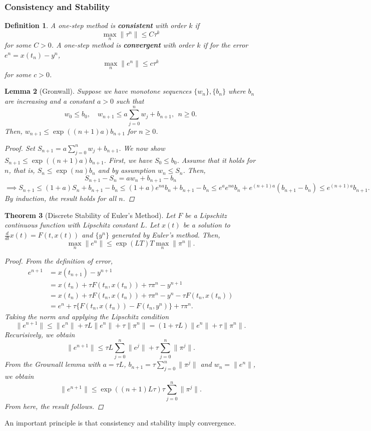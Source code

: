 \documentclass{article}
\newtheorem{theorem}{Theorem}[subsection] %
\newtheorem{lemma}[theorem]{Lemma}
\newtheorem{definition}[theorem]{Definition}
\theoremstyle{definition}
\theoremstyle{definition}
\begin{document}
\subsubsection{Consistency and Stability}
\begin{definition}
    A one-step method is \textbf{consistent} with order $k$ if
    $$\max_{n}\|\tau^n\|\leq C\tau^k$$
    for some $C>0$. A one-step method is \textbf{convergent} with order $k$ if for the error $e^n=x(t_n)-y^n$,
    $$\max_{n}\|e^n\|\leq c\tau^k$$
    for some $c>0$.
\end{definition}
\begin{lemma}[Gronwall]
    Suppose we have monotone sequences $\{w_n\},\{b_n\}$ where $b_n$ are increasing and a constant $a>0$ such that
    $$w_0\leq b_0,\quad w_{n+1}\leq a\sum_{j=0}^{n}w_j+b_{n+1},\:\:n\geq 0.$$
    Then, $w_{n+1}\leq \exp((n+1)a)b_{n+1}$ for $n\geq 0$.
    \begin{proof}
        Set $S_{n+1}=a\sum_{j=0}^{n}w_j+b_{n+1}$. We now show $S_{n+1}\leq \exp((n+1)a)b_{n+1}$. First, we have $S_0\leq b_0$. Assume that it holds for $n$, that is, $S_n\leq \exp(na)b_n$ and by assumption $w_n\leq S_n$. Then,
        $$S_{n+1}-S_n=aw_n+b_{n+1}-b_n$$
        $$\implies S_{n+1}\leq (1+a)S_n+b_{n+1}-b_n\leq (1+a)e^{na}b_n+b_{n+1}-b_n\leq e^{a}e^{na}b_n+e^{(n+1)a}(b_{n+1}-b_n)\leq e^{(n+1)a}b_{n+1}.$$
        By induction, the result holds for all $n$.
    \end{proof}
\end{lemma}
\begin{theorem}[Discrete Stability of Euler's Method]
    Let $F$ be a Lipschitz continuous function with Lipschitz constant $L$. Let $x(t)$ be a solution to $\frac{d}{dt}x(t)=F(t,x(t))$ and $\{y^n\}$ generated by Euler's method. Then,
    $$\max_{n}\|e^n\|\leq \exp(LT)T\max_{n}\|\pi^n\|.$$
    \begin{proof}
        From the definition of error,
        \begin{align*}
            e^{n+1}&=x(t_{n+1})-y^{n+1} \\
            &=x(t_n)+\tau F(t_n,x(t_n))+\tau \pi^n-y^{n+1}\\
            &=x(t_n)+\tau F(t_n,x(t_n))+\tau \pi^n-y^n-\tau F(t_n,x(t_n))\\
            &=e^n+\tau\{F(t_n,x(t_n))-F(t_n,y^n)\}+\tau \pi^n.
        \end{align*}
        Taking the norm and applying the Lipschitz condition
        $$\|e^{n+1}\|\leq \|e^n\|+\tau L\|e^n\|+\tau\|\pi^n\|=(1+\tau L)\|e^n\|+\tau\|\pi^n\|.$$
        Recurisively, we obtain
        $$\|e^{n+1}\|\leq \tau L\sum_{j=0}^{n}\|e^j\|+\tau \sum_{j=0}^{n}\|\pi^j\|.$$
        From the Grownall lemma with $a=\tau L$, $b_{n+1}=\tau \sum_{j=0}^{n}\|\pi^j\|$ and $w_n=\|e^n\|$, we obtain
        $$\|e^{n+1}\|\leq \exp((n+1)L\tau)\tau \sum_{j=0}^{n}\|\pi^j\|.$$
        From here, the result follows.
    \end{proof}
\end{theorem}
An important principle is that consistency and stability imply convergence.
\end{document}
